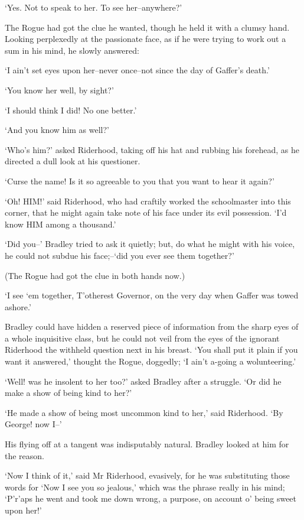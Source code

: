 ‘Yes. Not to speak to her. To see her--anywhere?’

The Rogue had got the clue he wanted, though he held it with a clumsy
hand. Looking perplexedly at the passionate face, as if he were trying
to work out a sum in his mind, he slowly answered:

‘I ain’t set eyes upon her--never once--not since the day of Gaffer’s
death.’

‘You know her well, by sight?’

‘I should think I did! No one better.’

‘And you know him as well?’

‘Who’s him?’ asked Riderhood, taking off his hat and rubbing his
forehead, as he directed a dull look at his questioner.

‘Curse the name! Is it so agreeable to you that you want to hear it
again?’

‘Oh! HIM!’ said Riderhood, who had craftily worked the schoolmaster into
this corner, that he might again take note of his face under its evil
possession. ‘I’d know HIM among a thousand.’

‘Did you--’ Bradley tried to ask it quietly; but, do what he might
with his voice, he could not subdue his face;--‘did you ever see them
together?’

(The Rogue had got the clue in both hands now.)

‘I see ‘em together, T’otherest Governor, on the very day when Gaffer
was towed ashore.’

Bradley could have hidden a reserved piece of information from the sharp
eyes of a whole inquisitive class, but he could not veil from the eyes
of the ignorant Riderhood the withheld question next in his breast.
‘You shall put it plain if you want it answered,’ thought the Rogue,
doggedly; ‘I ain’t a-going a wolunteering.’

‘Well! was he insolent to her too?’ asked Bradley after a struggle. ‘Or
did he make a show of being kind to her?’

‘He made a show of being most uncommon kind to her,’ said Riderhood. ‘By
George! now I--’

His flying off at a tangent was indisputably natural. Bradley looked at
him for the reason.

‘Now I think of it,’ said Mr Riderhood, evasively, for he was
substituting those words for ‘Now I see you so jealous,’ which was the
phrase really in his mind; ‘P’r’aps he went and took me down wrong, a
purpose, on account o’ being sweet upon her!’

